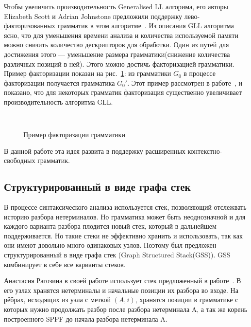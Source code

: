 \documentclass[14pt]{matmex-diploma-custom}
\begin{document}
    Чтобы увеличить производительность Generalised LL алгорима, его авторы Elizabeth Scott 
    и Adrian Johnstone предложили поддержку лево-факторизованных грамматик в этом алгоритме~\cite{scott2016structuring}.
    Из описания GLL алгоритма ясно, что для уменьшения времени анализа и количества используемой памяти
    можно снизить количество дескрипторов для обработки. Один из путей для достижения этого --- 
    уменьшение размера грамматики(снижение количества различных позиций в ней).
    Этого можно достичь факторизацией грамматики. Пример факторизации показан на рис.~\ref{fig:ExampleOfFactorization}:
    из грамматики $G_0$ в процессе факторизации получается грамматика $G_0'$.
    Этот пример рассмотрен в работе~\cite{scott2016structuring}, и показано, что для некоторых грамматик факторизация 
    существенно увеличивает производительность алгоритма GLL.
    \begin{figure}
        \centering
        ~
        \caption{Пример факторизации грамматики}
        \label{fig:ExampleOfFactorization}
    \end{figure}
    В данной работе эта идея развита в поддержку расширенных контекстно-свободных грамматик.
	
	\subsection{Структурированный в виде графа стек}
	В процессе синтаксического анализа используется стек, позволяющий отслежвать историю 
	разбора нетерминалов. Но грамматика может быть неоднозначной и для каждого варианта 
    разбора плодится новый стек, который в дальнейшем поддерживается.
    Но такие стеки не эффективно хранить и использовать, так как они имеют довольно много
    одинаковых узлов. Поэтому был предложен структурированный в виде графа стек
    (Graph Structured Stack(GSS)). GSS комбинирует в себе все варианты стеков.
    
    Анастасия Рагозина в своей работе использует стек предложенный в работе~\cite{afroozeh2015faster}.
    В его узлах хранятся нетерминалы и начальные позиции их разбора во входе.
    На рёбрах, исходящих из узла с меткой $(A, i)$, хранятся позиции в грамматике с которых нужно
    продолжать разбор после разбора нетерминала A, а так же корень построенного SPPF до начала 
    разбора нетерминала A.
    
\end{document}
